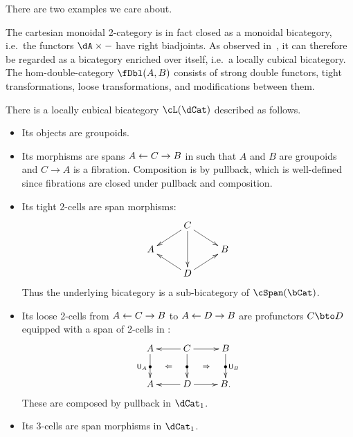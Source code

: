 \documentclass{amsart}
\newcommand{\hunit}[1]{\mathsf{U}_{#1}}
\begin{document}
There are two examples we care about.

\begin{eg}
  The cartesian monoidal 2-category \cDbl is in fact closed as a monoidal bicategory, i.e.\ the functors $\dA\times -$ have right biadjoints.
  As observed in~\cite{gg:lowdim-tricats}, it can therefore be regarded as a bicategory enriched over itself, i.e.\ a locally cubical bicategory.
  The hom-double-category $\fDbl(A,B)$ consists of strong double functors, tight transformations, loose transformations, and modifications between them.
\end{eg}

\begin{thm}
  There is a locally cubical bicategory $\cL(\dCat)$ described as follows.
  \begin{itemize}
  \item Its objects are groupoids.
  \item Its morphisms are spans $A \leftarrow C \to B$ in \bCat such that $A$ and $B$ are groupoids and $C\to A$ is a fibration.
    Composition is by pullback, which is well-defined since fibrations are closed under pullback and composition.
  \item Its tight 2-cells are span morphisms:
    \[ \xymatrix@R=1pc{ & C \ar[dl] \ar[dr] \ar[dd] \\ A && B \\ &D \ar[ul] \ar[ur] } \]
    Thus the underlying bicategory is a sub-bicategory of $\cSpan(\bCat)$.
  \item Its loose 2-cells from $A \leftarrow C \to B$ to $A\leftarrow D \to B$ are profunctors $C\bto D$ equipped with a span of 2-cells in \dCat:
    \[ \xymatrix{ A \ar[d]|{\bullet}_{\hunit A} \ar@{}[dr]|{\Leftarrow} &
      C \ar[l] \ar[d]|{\bullet} \ar[r] \ar@{}[dr]|{\Rightarrow} &
      B \ar[d]|{\bullet}^{\hunit B}\\
      A & D \ar[l] \ar[r] & B. } \]
    These are composed by pullback in $\dCat_1$.
  \item Its 3-cells are span morphisms in $\dCat_1$.
  \end{itemize}
\end{thm}
\end{document}
